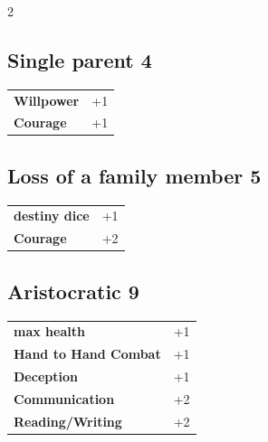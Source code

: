 \begin{multicols}{2}
\begin{tcolorbox}
\end{tcolorbox}

\begin{tcolorbox}
    \subsection*{Single parent \hfill \small{4 }}
    \tcblower




\begin{tabular}{@{}ll@{}}
    \textbf{Willpower} & +1\\
    \textbf{Courage} & +1\\
\end{tabular}


\end{tcolorbox}

\begin{tcolorbox}
    \subsection*{Loss of a family member \hfill \small{5 }}
    \tcblower




\begin{tabular}{@{}ll@{}}
    \textbf{destiny dice} & +1\\
    \textbf{Courage} & +2\\
\end{tabular}


\end{tcolorbox}

\begin{tcolorbox}
    \subsection*{Aristocratic \hfill \small{9 }}
    \tcblower




\begin{tabular}{@{}ll@{}}
    \textbf{max health} & +1\\
    \textbf{Hand to Hand Combat} & +1\\
    \textbf{Deception} & +1\\
    \textbf{Communication} & +2\\
    \textbf{Reading/Writing} & +2\\
\end{tabular}


\end{tcolorbox}
\end{multicols}
